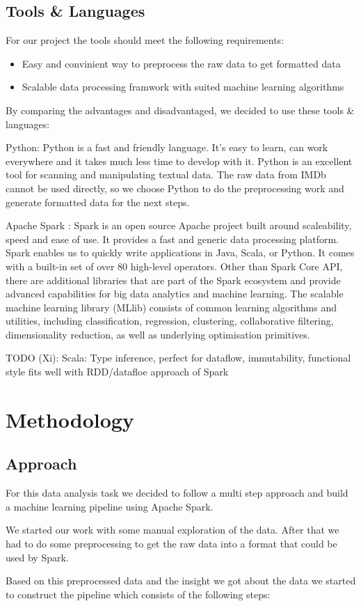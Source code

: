 \documentclass{vldb}
\begin{document}
\subsection{Tools & Languages}
\par For our project the tools should meet the following requirements:
\begin{itemize}
\item {Easy and convinient way to preprocess the raw data to get formatted data}
\item {Scalable data processing framwork with suited machine learning algorithms}
\end{itemize}
\par By comparing the advantages and disadvantaged, we decided to use these tools & languages:
\par Python: Python is a fast and friendly language. It's easy to learn, can work everywhere and it takes much less time to develop with it. Python is an excellent tool for scanning and manipulating textual data. The raw data from IMDb cannot be used directly, so we choose Python to do the preprocessing work and generate formatted data for the next steps. 
\par Apache Spark \cite{spark}: Spark is an open source Apache project built around scaleability, speed and ease of use. It provides a fast and generic data processing platform. Spark enables us to quickly write applications in Java, Scala, or Python. It comes with a built-in set of over 80 high-level operators. Other than Spark Core API, there are additional libraries that are part of the Spark ecosystem and provide advanced capabilities for big data analytics and machine learning. The scalable machine learning library (MLlib) consists of common learning algorithms and utilities, including classification, regression, clustering, collaborative filtering, dimensionality reduction, as well as underlying optimisation primitives.
\par TODO (Xi): Scala: Type inference, perfect for dataflow, immutability, functional style fits well with RDD/datafloe approach of Spark

\section{Methodology}

\subsection{Approach}
\par For this data analysis task we decided to follow a multi step approach and build a machine learning pipeline using Apache Spark.
\par We started our work with some manual exploration of the data. After that we had to do some preprocessing to get the raw data into a format that could be used by Spark.
\par Based on this preprocessed data and the insight we got about the data we started to construct the pipeline which consists of the following steps:
\end{document}
